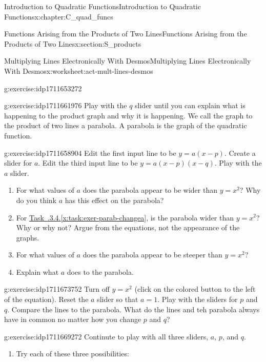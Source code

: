 \documentclass[oneside,10pt,]{book}
\newcommand{\xreffont}{\relax}
\numberwithin{equation}{chapter}
\begin{document}
\begin{chapterptx}{Introduction to Quadratic Functions}{}{Introduction to Quadratic Functions}{}{}{x:chapter:C_quad_funcs}
\begin{sectionptx}{Functions Arising from the Products of Two Lines}{}{Functions Arising from the Products of Two Lines}{}{}{x:section:S_products}
\begin{worksheet-subsection}{Multiplying Lines Electronically With Desmos}{}{Multiplying Lines Electronically With Desmos}{}{}{x:worksheet:act-mult-lines-desmos}
\begin{divisionexercise}{2}{}{}{g:exercise:idp1711653272}
\begin{enumerate}[font=\bfseries,label=(\alph*),ref=\alph*]
\end{enumerate}
\end{divisionexercise}%
\begin{divisionexercise}{3}{}{}{g:exercise:idp1711661976}%
Play with the \(q\) slider until you can explain what is happening to the product graph and why it is happening. We call the graph to the product of two lines a parabola. A parabola is the graph of the quadratic function.%
\end{divisionexercise}%
\begin{divisionexercise}{4}{}{}{g:exercise:idp1711658904}%
Edit the first input line to be \(y = a (x - p)\). Create a slider for \(a\). Edit the third input line to be \(y = a (x - p)(x - q)\). Play with the \(a\) slider.%
\begin{enumerate}[font=\bfseries,label=(\alph*),ref=\alph*]
\item\label{x:task:exer-parab-changea}For what values of \(a\) does the parabola appear to be wider than \(y = x^2\)? Why do you think \(a\) has this effect on the parabola?%
\item{}For \hyperref[x:task:exer-parab-changea]{Task~{\xreffont 4.2.3.4}.{\xreffont\ref{x:task:exer-parab-changea}}}, is the parabola wider than \(y = x^2\)? Why or why not? Argue from the equations, not the appearance of the graphs.%
\item{}For what values of \(a\) does the parabola appear to be steeper than \(y = x^2\)?%
\item{}Explain what \(a\) does to the parabola.%
\end{enumerate}
\end{divisionexercise}%
\begin{divisionexercise}{5}{}{}{g:exercise:idp1711673752}%
Turn off \(y = x^2\) (click on the colored button to the left of the equation). Reset the \(a\) slider so that \(a = 1\). Play with the sliders for \(p\) and \(q\). Compare the lines to the parabola. What do the lines and teh parabola always have in common no matter how you change \(p\) and \(q\)?%
\end{divisionexercise}%
\begin{divisionexercise}{6}{}{}{g:exercise:idp1711669272}%
Continute to play with all three sliders, \(a\), \(p\), and \(q\).%
\begin{enumerate}[font=\bfseries,label=(\alph*),ref=\alph*]
\item{}Try each of these three possibilities:%
\begin{enumerate}[font=\bfseries,label=(\roman*),ref=\theenumi.\roman*]

\end{enumerate}
\end{enumerate}
\end{divisionexercise}
\end{worksheet-subsection}
\end{sectionptx}
\end{chapterptx}
\end{document}
